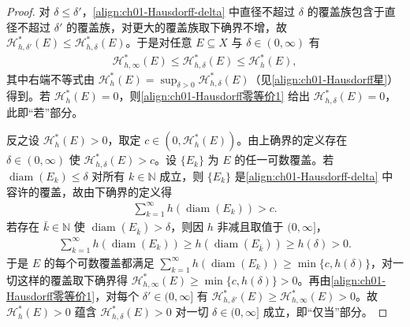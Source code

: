 \documentclass[../../main.tex]{subfiles}%
\begin{document}
\begin{proof}
对 $\delta\leqslant\delta'$，\eqref{align:ch01-Hausdorff-delta} 中直径不超过 $\delta$ 的覆盖族包含于直径不超过 $\delta'$ 的覆盖族，对更大的覆盖族取下确界不增，故 $\mathcal{H}_{h,\delta'}^*(E)\leqslant\mathcal{H}_{h,\delta}^*(E)$。于是对任意 $E\subseteq X$ 与 $\delta\in(0,\infty)$ 有
\begin{align}
\mathcal{H}_{h,\infty}^*(E)\leqslant\mathcal{H}_{h,\delta}^*(E)\leqslant\mathcal{H}_h^*(E), \label{align:ch01-Hausdorff零等价1}
\end{align}
其中右端不等式由 $\mathcal{H}_h^*(E)=\sup_{\delta>0}\mathcal{H}_{h,\delta}^*(E)$（见\eqref{align:ch01-Hausdorff星}）得到。若 $\mathcal{H}_h^*(E)=0$，则\eqref{align:ch01-Hausdorff零等价1} 给出 $\mathcal{H}_{h,\delta}^*(E)=0$，此即“若”部分。

反之设 $\mathcal{H}_h^*(E)>0$，取定 $c\in(0,\mathcal{H}_h^*(E))$。由上确界的定义存在 $\delta\in(0,\infty)$ 使 $\mathcal{H}_{h,\delta}^*(E)>c$。设 $\{E_k\}$ 为 $E$ 的任一可数覆盖。若 $\operatorname{diam}(E_k)\leqslant\delta$ 对所有 $k\in\mathbb{N}$ 成立，则 $\{E_k\}$ 是\eqref{align:ch01-Hausdorff-delta} 中容许的覆盖，故由下确界的定义得
\begin{align*}
\sum_{k=1}^\infty h(\operatorname{diam}(E_k))>c .
\end{align*}
若存在 $\bar{k}\in\mathbb{N}$ 使 $\operatorname{diam}(E_{\bar{k}})>\delta$，则因 $h$ 非减且取值于 $(0,\infty]$，
\begin{align*}
\sum_{k=1}^\infty h(\operatorname{diam}(E_k))\geqslant h(\operatorname{diam}(E_{\bar{k}}))\geqslant h(\delta)>0 .
\end{align*}
于是 $E$ 的每个可数覆盖都满足 $\sum_{k=1}^\infty h(\operatorname{diam}(E_k))\geqslant\min\{c,h(\delta)\}$，对一切这样的覆盖取下确界得 $\mathcal{H}_{h,\infty}^*(E)\geqslant\min\{c,h(\delta)\}>0$。再由\eqref{align:ch01-Hausdorff零等价1}，对每个 $\delta'\in(0,\infty]$ 有 $\mathcal{H}_{h,\delta'}^*(E)\geqslant\mathcal{H}_{h,\infty}^*(E)>0$。故 $\mathcal{H}_h^*(E)>0$ 蕴含 $\mathcal{H}_{h,\delta}^*(E)>0$ 对一切 $\delta\in(0,\infty]$ 成立，即“仅当”部分。
\end{proof}
\end{document}
